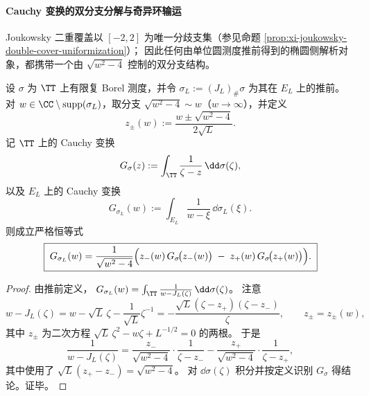 \paragraph{Cauchy 变换的双分支分解与奇异环输运}
Joukowsky 二重覆盖以 \([-2,2]\) 为唯一分歧支集（参见命题 \ref{prop:xi-joukowsky-double-cover-uniformization}）；
因此任何由单位圆测度推前得到的椭圆侧解析对象，都携带一个由 \(\sqrt{w^2-4}\) 控制的双分支结构。

\begin{theorem}\label{thm:xi-joukowsky-cauchy-transform-two-branch}
设 \(\sigma\) 为 \(\TT\) 上有限复 Borel 测度，并令 \(\sigma_L:=(J_L)_\#\sigma\) 为其在 \(E_L\) 上的推前。
对 \(w\in\CC\setminus\mathrm{supp}(\sigma_L)\)，取分支 \(\sqrt{w^2-4}\sim w\)（\(w\to\infty\)），并定义
\[
z_\pm(w):=\frac{w\pm\sqrt{w^2-4}}{2\sqrt{L}}.
\]
记 \(\TT\) 上的 Cauchy 变换
\[
G_\sigma(z):=\int_{\TT}\frac{1}{\zeta-z}\,\dd\sigma(\zeta),
\]
以及 \(E_L\) 上的 Cauchy 变换
\[
G_{\sigma_L}(w):=\int_{E_L}\frac{1}{w-\xi}\,\dd\sigma_L(\xi).
\]
则成立严格恒等式
\[
\boxed{\;
G_{\sigma_L}(w)=\frac{1}{\sqrt{w^2-4}}
\Bigl(
z_-(w)\,G_\sigma\!\bigl(z_-(w)\bigr)\;-\;z_+(w)\,G_\sigma\!\bigl(z_+(w)\bigr)
\Bigr).\;}
\]
\end{theorem}

\begin{proof}
由推前定义，
\(
G_{\sigma_L}(w)=\int_{\TT}\frac{1}{w-J_L(\zeta)}\,\dd\sigma(\zeta)
\)。
注意
\[
w-J_L(\zeta)=w-\sqrt{L}\,\zeta-\frac{1}{\sqrt{L}}\zeta^{-1}
=-\frac{\sqrt{L}(\zeta-z_+)(\zeta-z_-)}{\zeta},
\qquad
z_\pm=z_\pm(w),
\]
其中 \(z_\pm\) 为二次方程 \(\sqrt{L}\,\zeta^2-w\zeta+L^{-1/2}=0\) 的两根。
于是
\[
\frac{1}{w-J_L(\zeta)}
=\frac{z_-}{\sqrt{w^2-4}}\cdot\frac{1}{\zeta-z_-}-\frac{z_+}{\sqrt{w^2-4}}\cdot\frac{1}{\zeta-z_+},
\]
其中使用了 \(\sqrt{L}(z_+-z_-)=\sqrt{w^2-4}\)。
对 \(\dd\sigma(\zeta)\) 积分并按定义识别 \(G_\sigma\) 得结论。证毕。
\end{proof}



